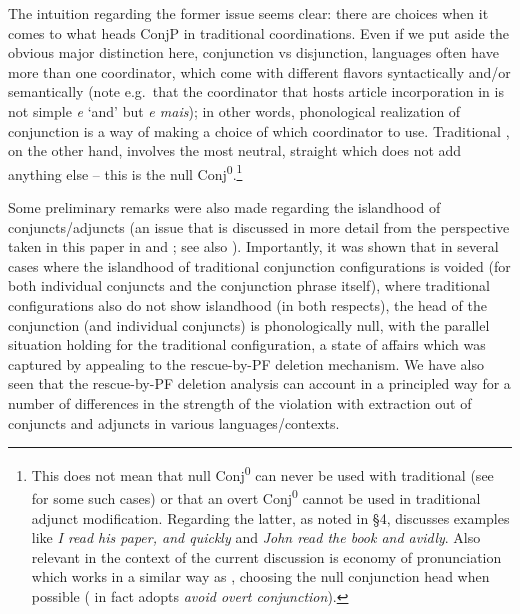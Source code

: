 \documentclass[output=paper]{langsci/langscibook}
\begin{document}
\largerpage[-2]
The intuition regarding the former issue seems clear: there are choices when it
comes to what heads ConjP in traditional coordinations. Even if we put aside the
obvious major distinction here, conjunction vs disjunction, languages often
have more than one coordinator, which come with different flavors syntactically
and/or semantically (note e.g.\ that the coordinator that hosts article
incorporation in  is not simple \emph{e} ‘and’ but \emph{e mais}); in
other words, phonological realization of conjunction is a way of making a
choice of which coordinator to use. Traditional , on the other
hand, involves the most neutral, straight  which does not add
anything else – this is the null Conj\textsuperscript{0}.\footnote{This does
    not mean that null Conj\textsuperscript{0} can never be used with
    traditional  (see \citealt{Progovac1999} for some such
    cases) or that an overt Conj\textsuperscript{0} cannot be used in
    traditional adjunct modification.  Regarding the latter, as noted in §4,
    \textcite{Progovac1998,Progovac1999} discusses examples like \emph{I read
    his paper, and quickly} and \emph{John read the book and avidly}. Also
    relevant in the context of the current discussion is 
    economy of pronunciation which works in a similar way as
     \emph{}, choosing the
    null conjunction head when possible (\citealt{Progovac1998} in fact adopts
    \emph{avoid overt conjunction}).\label{fn:27}}

Some preliminary remarks were also made regarding the islandhood of
conjuncts/adjuncts (an issue that is discussed in more detail from the
perspective taken in this paper in \citealt{Oda:2017} and
\citealt{Boskovic2017}; see also \citealt{Boskovicinprep}). Importantly, it was
shown that in several cases where the islandhood of traditional conjunction
configurations is voided (for both individual conjuncts and the conjunction
phrase itself), where traditional  configurations also do not show
islandhood (in both respects), the head of the conjunction (and individual
conjuncts) is phonologically null, with the parallel situation holding for the
traditional  configuration, a state of affairs which was
captured by appealing to the rescue-by-\gls{PF} deletion mechanism. We have
also seen that the rescue-by-PF deletion analysis can account in a principled
way for a number of differences in the strength of the violation with
extraction out of conjuncts and adjuncts in various
languages/contexts.
\end{document}
